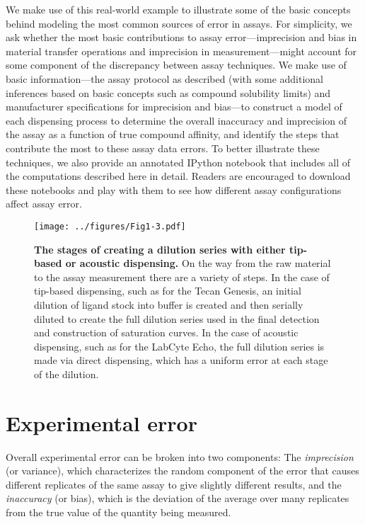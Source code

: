 \documentclass[aps,pre,twocolumn,nofootinbib,superscriptaddress,linenumbers]{revtex4-1}
\begin{document}
We make use of this real-world example to illustrate some of the basic concepts behind modeling the most common sources of error in assays.
For simplicity, we ask whether the most basic contributions to assay error---imprecision and bias in material transfer operations and imprecision in measurement---might account for some component of the discrepancy between assay techniques.
We make use of basic information---the assay protocol as described (with some additional inferences based on basic concepts such as compound solubility limits) and manufacturer specifications for imprecision and bias---to construct a model of each dispensing process to determine the overall inaccuracy and imprecision of the assay as a function of true compound affinity, and identify the steps that contribute the most to these assay data errors.
To better illustrate these techniques, we also provide an annotated IPython notebook that includes all of the computations described here in detail.
Readers are encouraged to download these notebooks and play with them to see how different assay configurations affect assay error.

\begin{figure*}[tb]
   \texttt{[image: ../figures/Fig1-3.pdf]}
  \caption{{\bf The stages of creating a dilution series with either tip-based or acoustic dispensing.}
  On the way from the raw material to the assay measurement there are a variety of steps. In the case of tip-based dispensing, such as for the Tecan Genesis, an initial dilution of ligand stock into buffer is created and then serially diluted to create the full dilution series used in the final detection and construction of saturation curves. In the case of acoustic dispensing, such as for the LabCyte Echo, the full dilution series is made via direct dispensing, which has a uniform error at each stage of the dilution.
  }
  \label{overview}
\end{figure*}


\section{Experimental error}

Overall experimental error can be broken into two components: The \emph{imprecision} (or variance), which characterizes the random component of the error that causes different replicates of the same assay to give slightly different results, and the \emph{inaccuracy} (or bias), which is the deviation of the average over many replicates from the true value of the quantity being measured.
\end{document}
